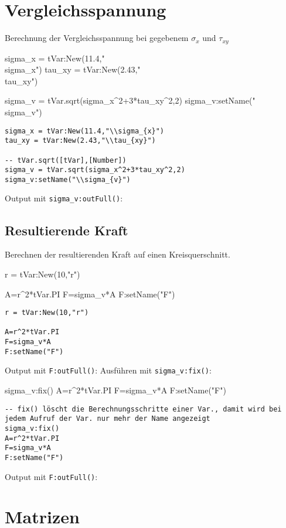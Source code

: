 \section{Vergleichsspannung}
Berechnung der Vergleichsspannung bei gegebenem $\sigma_{x}$ und $\tau_{xy}$
\begin{luacode*}
	sigma_x = tVar:New(11.4,"\\sigma_{x}")
	tau_xy = tVar:New(2.43,"\\tau_{xy}")
	
	sigma_v = tVar.sqrt(sigma_x^2+3*tau_xy^2,2)
	sigma_v:setName("\\sigma_{v}")
\end{luacode*}
\begin{lstlisting}
sigma_x = tVar:New(11.4,"\\sigma_{x}")
tau_xy = tVar:New(2.43,"\\tau_{xy}")

-- tVar.sqrt([tVar],[Number])
sigma_v = tVar.sqrt(sigma_x^2+3*tau_xy^2,2)
sigma_v:setName("\\sigma_{v}")
\end{lstlisting}
Output mit \lstinline{sigma_v:outFull()}:
\subsection{Resultierende Kraft}
Berechnen der resultierenden Kraft auf einen Kreisquerschnitt.
\begin{luacode*}
	r = tVar:New(10,"r")

	A=r^2*tVar.PI
	F=sigma_v*A
	F:setName("F")
\end{luacode*}
\begin{lstlisting}
r = tVar:New(10,"r")

A=r^2*tVar.PI
F=sigma_v*A
F:setName("F")
\end{lstlisting}
Output mit \lstinline{F:outFull()}:
Ausführen mit \lstinline{sigma_v:fix()}:
\begin{luacode*}
	sigma_v:fix()
	A=r^2*tVar.PI
	F=sigma_v*A
	F:setName("F")
\end{luacode*}
\begin{lstlisting}
-- fix() löscht die Berechnungsschritte einer Var., damit wird bei jedem Aufruf der Var. nur mehr der Name angezeigt
sigma_v:fix()
A=r^2*tVar.PI
F=sigma_v*A
F:setName("F")
\end{lstlisting}
Output mit \lstinline{F:outFull()}:
\section{Matrizen}
